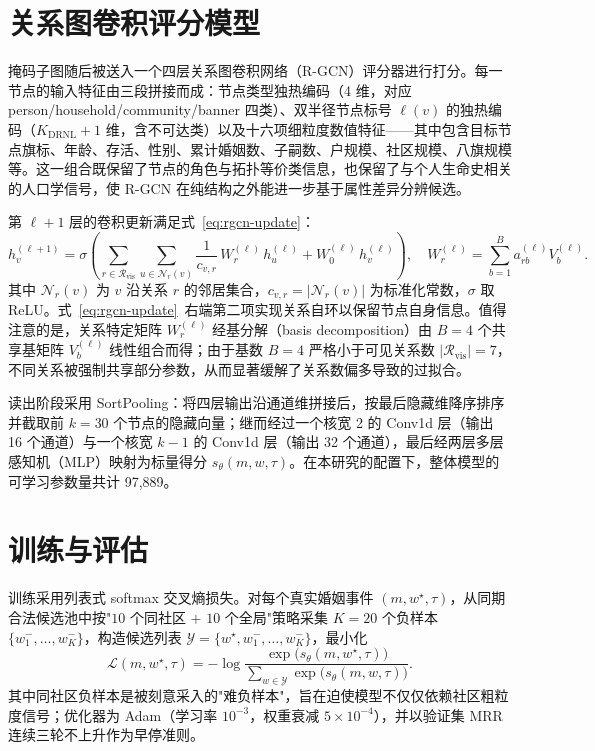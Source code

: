\section{关系图卷积评分模型}\label{sec:seal-rgcn}

掩码子图随后被送入一个四层关系图卷积网络（R-GCN）评分器进行打分。每一节点的输入特征由三段拼接而成：节点类型独热编码（4 维，对应 person/household/community/banner 四类）、双半径节点标号 $\ell(v)$ 的独热编码（$K_\mathrm{DRNL}+1$ 维，含不可达类）以及十六项细粒度数值特征——其中包含目标节点旗标、年龄、存活、性别、累计婚姻数、子嗣数、户规模、社区规模、八旗规模等\citep{fey2019pyg}。这一组合既保留了节点的角色与拓扑等价类信息，也保留了与个人生命史相关的人口学信号，使 R-GCN 在纯结构之外能进一步基于属性差异分辨候选。

第 $\ell+1$ 层的卷积更新满足式~\eqref{eq:rgcn-update}：
\begin{equation}\label{eq:rgcn-update}
h_v^{(\ell+1)}=\sigma\!\left(\sum_{r\in\mathcal{R}_\mathrm{vis}}\sum_{u\in\mathcal{N}_r(v)}\frac{1}{c_{v,r}}\,W_r^{(\ell)}\,h_u^{(\ell)}+W_0^{(\ell)}\,h_v^{(\ell)}\right),\quad W_r^{(\ell)}=\sum_{b=1}^{B}a_{rb}^{(\ell)}V_b^{(\ell)}.
\end{equation}
其中 $\mathcal{N}_r(v)$ 为 $v$ 沿关系 $r$ 的邻居集合，$c_{v,r}=|\mathcal{N}_r(v)|$ 为标准化常数，$\sigma$ 取 ReLU。式~\eqref{eq:rgcn-update}~右端第二项实现关系自环以保留节点自身信息。值得注意的是，关系特定矩阵 $W_r^{(\ell)}$ 经基分解（basis decomposition）由 $B=4$ 个共享基矩阵 $V_b^{(\ell)}$ 线性组合而得；由于基数 $B=4$ 严格小于可见关系数 $|\mathcal{R}_\mathrm{vis}|=7$，不同关系被强制共享部分参数，从而显著缓解了关系数偏多导致的过拟合。

读出阶段采用 SortPooling：将四层输出沿通道维拼接后，按最后隐藏维降序排序并截取前 $k=30$ 个节点的隐藏向量；继而经过一个核宽 2 的 Conv1d 层（输出 16 个通道）与一个核宽 $k-1$ 的 Conv1d 层（输出 32 个通道），最后经两层多层感知机（MLP）映射为标量得分 $s_\theta(m,w,\tau)$。在本研究的配置下，整体模型的可学习参数量共计 97{,}889。

\section{训练与评估}\label{sec:seal-train}

训练采用列表式 softmax 交叉熵损失。对每个真实婚姻事件 $(m,w^\star,\tau)$，从同期合法候选池中按"$10$ 个同社区 $+$ $10$ 个全局"策略采集 $K=20$ 个负样本 $\{w_1^-,\dots,w_K^-\}$，构造候选列表 $\mathcal{Y}=\{w^\star,w_1^-,\dots,w_K^-\}$，最小化
\begin{equation*}
\mathcal{L}(m,w^\star,\tau)=-\log\frac{\exp\!\big(s_\theta(m,w^\star,\tau)\big)}{\sum_{w\in\mathcal{Y}}\exp\!\big(s_\theta(m,w,\tau)\big)}.
\end{equation*}
其中同社区负样本是被刻意采入的"难负样本"，旨在迫使模型不仅仅依赖社区粗粒度信号；优化器为 Adam（学习率 $10^{-3}$，权重衰减 $5\times 10^{-4}$），并以验证集 MRR 连续三轮不上升作为早停准则。

